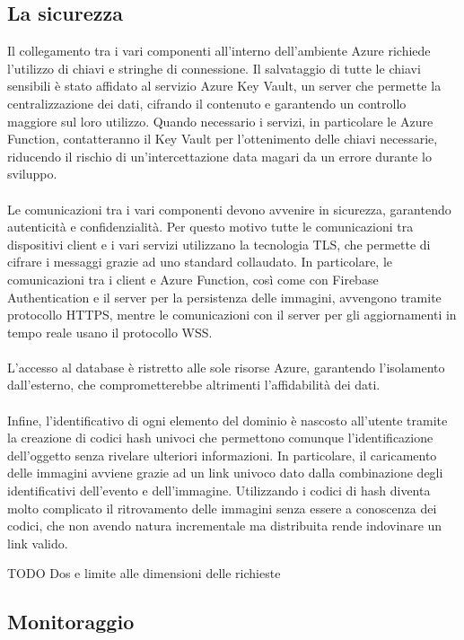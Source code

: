 \clearpage
\subsection{La sicurezza}

Il collegamento tra i vari componenti all’interno dell’ambiente Azure richiede l’utilizzo di chiavi e stringhe di connessione. 
Il salvataggio di tutte le chiavi sensibili è stato affidato al servizio Azure Key Vault,
 un server che permette la centralizzazione dei dati, cifrando il contenuto e garantendo un controllo maggiore sul loro utilizzo. 
Quando necessario i servizi, in particolare le Azure Function, contatteranno il Key Vault per l’ottenimento delle chiavi necessarie, 
riducendo il rischio di un’intercettazione data magari da un errore durante lo sviluppo.\\
\\
Le comunicazioni tra i vari componenti devono avvenire in sicurezza, garantendo autenticità e confidenzialità. 
Per questo motivo tutte le comunicazioni tra dispositivi client e i vari servizi utilizzano la tecnologia TLS, che permette di cifrare i messaggi grazie ad uno standard collaudato. 
In particolare, le comunicazioni tra i client e Azure Function, così come con Firebase Authentication e il server per la persistenza delle immagini, 
avvengono tramite protocollo HTTPS, mentre le comunicazioni con il server per gli aggiornamenti in tempo reale usano il protocollo WSS.\\
\\
L’accesso al database è ristretto alle sole risorse Azure, garantendo l’isolamento dall’esterno, che comprometterebbe altrimenti l’affidabilità dei dati.\\
\\
Infine, l’identificativo di ogni elemento del dominio è nascosto all’utente tramite la creazione di codici hash univoci 
che permettono comunque l’identificazione dell’oggetto senza rivelare ulteriori informazioni. 
In particolare, il caricamento delle immagini avviene grazie ad un link univoco dato dalla combinazione degli identificativi dell’evento e dell’immagine. 
Utilizzando i codici di hash diventa molto complicato il ritrovamento delle immagini senza essere a conoscenza dei codici, 
che non avendo natura incrementale ma distribuita rende indovinare un link valido.

TODO Dos e limite alle dimensioni delle richieste

\clearpage
\subsection{Monitoraggio}

